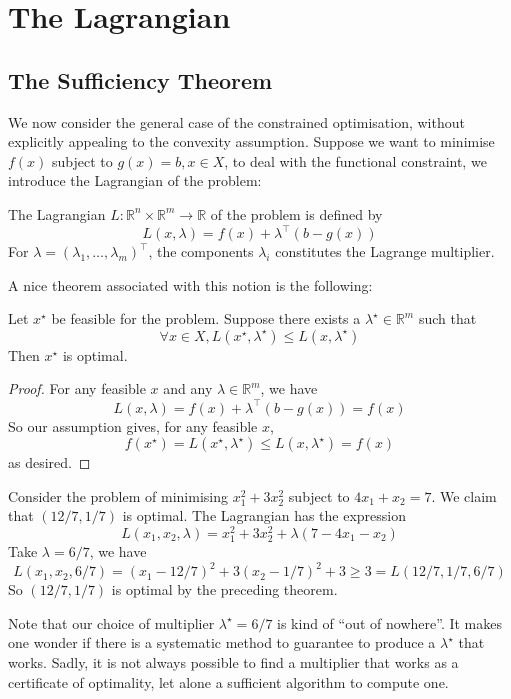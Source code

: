 \section{The Lagrangian}
\subsection{The Sufficiency Theorem}
We now consider the general case of the constrained optimisation, without explicitly appealing to the convexity assumption.
Suppose we want to minimise $f(x)$ subject to $g(x)=b,x\in X$, to deal with the functional constraint, we introduce the Lagrangian of the problem:
\begin{definition}[Lagrangian]
    The Lagrangian $L:\mathbb R^n\times\mathbb R^m\to\mathbb R$ of the problem is defined by
    $$L(x,\lambda)=f(x)+\lambda^\top(b-g(x))$$
    For $\lambda=(\lambda_1,\ldots,\lambda_m)^\top$, the components $\lambda_i$ constitutes the Lagrange multiplier.
\end{definition}
A nice theorem associated with this notion is the following:
\begin{theorem}\label{lagrange_suff}
    Let $x^\star$ be feasible for the problem.
    Suppose there exists a $\lambda^\star\in\mathbb R^m$ such that
    $$\forall x\in X,L(x^\star,\lambda^\star)\le L(x,\lambda^\star)$$
    Then $x^\star$ is optimal.
\end{theorem}
\begin{proof}
    For any feasible $x$ and any $\lambda\in\mathbb R^m$, we have
    $$L(x,\lambda)=f(x)+\lambda^\top(b-g(x))=f(x)$$
    So our assumption gives, for any feasible $x$,
    $$f(x^\star)=L(x^\star,\lambda^\star)\le L(x,\lambda^\star)=f(x)$$
    as desired.
\end{proof}
\begin{example}
    Consider the problem of minimising $x_1^2+3x_2^2$ subject to $4x_1+x_2=7$.
    We claim that $(12/7,1/7)$ is optimal.
    The Lagrangian has the expression
    $$L(x_1,x_2,\lambda)=x_1^2+3x_2^2+\lambda(7-4x_1-x_2)$$
    Take $\lambda=6/7$, we have
    $$L(x_1,x_2,6/7)=(x_1-12/7)^2+3(x_2-1/7)^2+3\ge 3=L(12/7,1/7,6/7)$$
    So $(12/7,1/7)$ is optimal by the preceding theorem.
\end{example}
Note that our choice of multiplier $\lambda^\star=6/7$ is kind of ``out of nowhere''.
It makes one wonder if there is a systematic method to guarantee to produce a $\lambda^\star$ that works.
Sadly, it is not always possible to find a multiplier that works as a certificate of optimality, let alone a sufficient algorithm to compute one.
